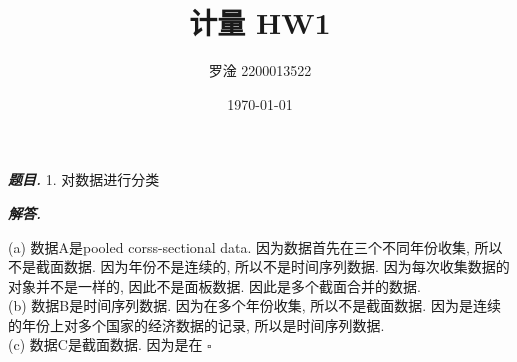 \documentclass[10pt, a4paper, oneside]{ctexart}
\title{\textbf{计量 HW1}}
\author{罗淦 2200013522}
\date{\today}
\newenvironment{problem}{\begin{framed}\par\noindent\textbf{\textit{题目. }}}{\end{framed}\par}
\newenvironment{solution}{%
  \par\noindent\textbf{\textit{解答. }}\ignorespaces
}{%
  \hfill\ensuremath{\square}\par %
}
\begin{document}
\maketitle

\begin{problem}
1. 对数据进行分类
\end{problem}
\begin{solution}
(a) 数据A是pooled corss-sectional data. 因为数据首先在三个不同年份收集, 所以不是截面数据. 因为年份不是连续的, 所以不是时间序列数据. 因为每次收集数据的对象并不是一样的, 因此不是面板数据. 因此是多个截面合并的数据.\\
(b) 数据B是时间序列数据. 因为在多个年份收集, 所以不是截面数据. 因为是连续的年份上对多个国家的经济数据的记录, 所以是时间序列数据. \\
(c) 数据C是截面数据. 因为是在
\end{solution}
\end{document}
